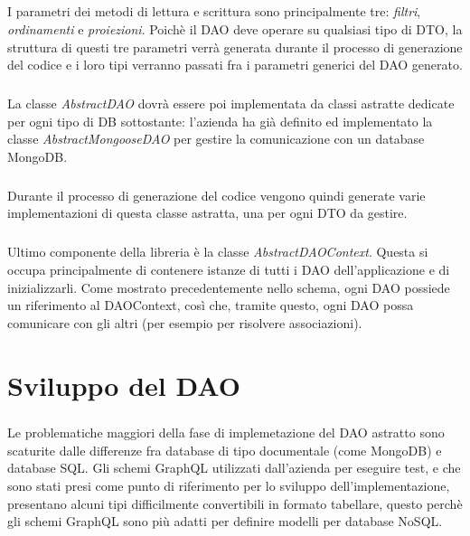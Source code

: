 \documentclass[a4paper, 12pt]{report}
\begin{document}
    \paragraph*{}
    I parametri dei metodi di lettura e scrittura sono principalmente tre: \emph{filtri}, \emph{ordinamenti} e \emph{proiezioni}.
    Poichè il DAO deve operare su qualsiasi tipo di DTO, la struttura di questi tre parametri verrà generata durante il processo di generazione del codice e i loro tipi
    verranno passati fra i parametri generici del DAO generato.
    \paragraph*{}
    La classe \emph{AbstractDAO} dovrà essere poi implementata da classi astratte dedicate per ogni tipo di DB sottostante: l'azienda ha già definito ed implementato la classe \emph{AbstractMongooseDAO} per gestire la comunicazione con un database MongoDB.
    \paragraph*{}
    Durante il processo di generazione del codice vengono quindi generate varie implementazioni di questa classe astratta, una per ogni DTO da gestire.
    \paragraph*{}
    Ultimo componente della libreria è la classe \emph{AbstractDAOContext}. Questa si occupa principalmente di contenere istanze di tutti i DAO dell'applicazione e di inizializzarli.
    Come mostrato precedentemente nello schema, ogni DAO possiede un riferimento al DAOContext, così che, tramite questo, ogni DAO possa comunicare con gli altri (per esempio per risolvere associazioni).
  \newpage
  \chapter{Sviluppo del DAO}
    \paragraph*{}
    Le problematiche maggiori della fase di implemetazione del DAO astratto sono scaturite dalle differenze fra database di tipo documentale (come MongoDB) e database SQL.
    Gli schemi GraphQL utilizzati dall'azienda per eseguire test, e che sono stati presi come punto di riferimento per lo sviluppo dell'implementazione, presentano alcuni tipi difficilmente convertibili in formato tabellare, questo perchè gli schemi GraphQL sono
    più adatti per definire modelli per database NoSQL.
\end{document}
